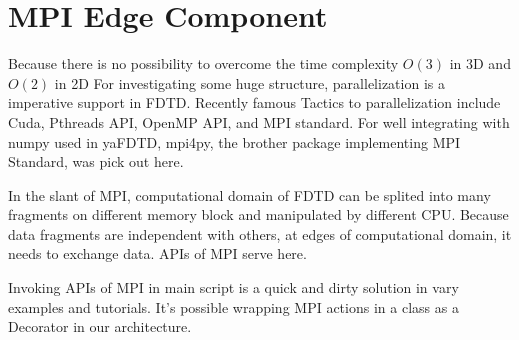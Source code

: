 \section{MPI Edge Component}
Because there is no possibility to overcome the time complexity $O(3)$ in 3D and $O(2)$ in 2D For
investigating some huge structure, parallelization is a imperative support in FDTD. Recently famous Tactics to
parallelization include Cuda, Pthreads API, OpenMP API, and MPI standard. For well integrating with numpy used in
yaFDTD, mpi4py, the brother package implementing MPI Standard, was pick out here. 

In the slant of MPI, computational domain of FDTD can be splited into many fragments on different memory block and
manipulated by different CPU. Because data fragments are independent with others, at edges of computational domain, it
needs to exchange data. APIs of MPI serve here.

Invoking APIs of MPI in main script is a quick and dirty solution in vary examples and tutorials. It's possible wrapping
MPI actions in a class as a Decorator in our architecture. 
\begin{code}
  
\end{code}

